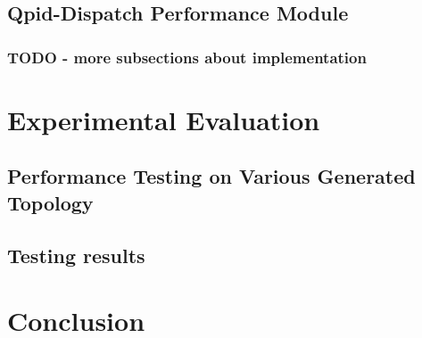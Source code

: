 \section{Qpid-Dispatch Performance Module}

\subsection{TODO - more subsections about implementation}

\chapter{Experimental Evaluation}

\section{Performance Testing on Various Generated Topology}

\section{Testing results}

\chapter{Conclusion}

